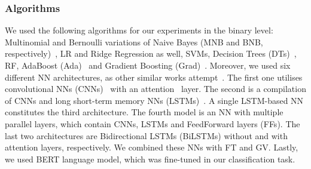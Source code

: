 \documentclass[sigconf]{acmart}
\begin{document}
\subsubsection{Algorithms}
We used the following algorithms for our experiments in the binary level: Multinomial and Bernoulli variations of Naive Bayes (MNB and BNB, respectively)~\cite{NB1,NB2}, LR and Ridge Regression as well, SVMs, Decision Trees (DTs)~\cite{DTrees}, RF, AdaBoost (Ada)~\cite{ABoost} and Gradient Boosting (Grad)~\cite{GBoost}. Moreover, we used six different NN architectures, as other similar works attempt~\cite{DBLP:journals/corr/abs-2003-07459}. The first one utilises convolutional NNs (CNNs)~\cite{CNNnets} with an attention~\cite{attentionLayers} layer. The second is a compilation of CNNs and long short-term memory NNs (LSTMs)~\cite{LSTMnets}. A single LSTM-based NN constitutes the third architecture. The fourth model is an NN with multiple parallel layers, which contain CNNs, LSTMs and FeedForward layers (FFs). The last two architectures are Bidirectional LSTMs (BiLSTMs) without and with attention layers, respectively. We combined these NNs with FT and GV. Lastly, we used BERT language model, which was fine-tuned in our classification task.
\end{document}
